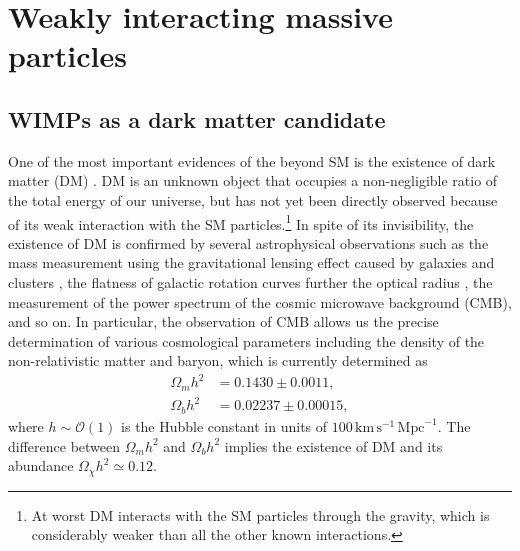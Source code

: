 \documentclass[12pt,twoside,book]{article}
\begin{document}
\section[Weakly interacting massive particles]{Weakly interacting
 massive particles}
\setcounter{equation}{0}

\vskip 0.1in

\subsection{WIMPs as a dark matter candidate}

One of the most important evidences of the beyond SM is the existence of
dark matter (DM) \cite{Zwicky:1933}.  DM is an unknown object that
occupies a non-negligible ratio of the total energy of our universe, but
has not yet been directly observed because of its weak interaction with
the SM particles.\footnote{
At worst DM interacts with the SM particles through the gravity, which
is considerably weaker than all the other known interactions.
}
In spite of its invisibility, the existence of DM is confirmed by
several astrophysical observations such as the mass measurement using
the gravitational lensing effect caused by galaxies and clusters
\cite{Zwicky:1937, Trimble:1987ee}, the flatness of galactic rotation
curves further the optical radius \cite{1939LicOB..19...41B,
Begeman:1991iy}, the measurement of the power spectrum of the cosmic
microwave background (CMB), and so on.  In particular, the observation
of CMB allows us the precise determination of various cosmological
parameters \cite{Jungman:1995av, Jungman:1995bz} including the density
of the non-relativistic matter and baryon, which is currently
determined as \cite{Aghanim:2018eyx}
\begin{align}
 \Omega_m h^2 &= 0.1430 \pm 0.0011,\\
 \Omega_b h^2 &= 0.02237 \pm 0.00015,
\end{align}
where $h \sim \mathcal{O}(1)$ is the Hubble constant in units of
$100\, \mathrm{km}\, \mathrm{s}^{-1}\, \mathrm{Mpc}^{-1}$.  The
difference between $\Omega_m h^2$ and $\Omega_b h^2$ implies the
existence of DM and its abundance $\Omega_\chi h^2 \simeq 0.12$.
\end{document}
